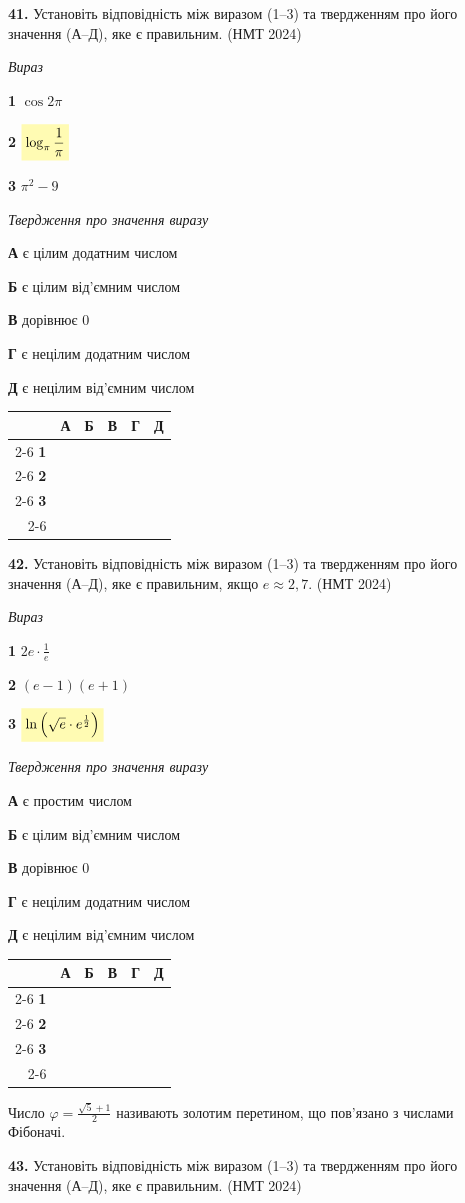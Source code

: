 \documentclass[14pt]{extarticle}
\newcommand{\answerGrid}{
    \begingroup
    \renewcommand{\arraystretch}{1.3} 
    \setlength{\tabcolsep}{7pt} 
    \begin{tabular}{r|c|c|c|c|c|}
         \multicolumn{1}{c}{} & \multicolumn{1}{c}{\textbf{А}} & \multicolumn{1}{c}{\textbf{Б}} & \multicolumn{1}{c}{\textbf{В}} & \multicolumn{1}{c}{\textbf{Г}} & \multicolumn{1}{c}{\textbf{Д}} \\ \cline{2-6}
         \textbf{1} & & & & & \\ \cline{2-6}
         \textbf{2} & & & & & \\ \cline{2-6}
         \textbf{3} & & & & & \\ \cline{2-6}
    \end{tabular}
    \endgroup
}
\newcommand{\matchingLayout}[3]{
    \noindent
    \begin{minipage}[t]{0.40\textwidth}
        #1
    \end{minipage}%
    \hfill
    \begin{minipage}[t]{0.28\textwidth}
        #2
    \end{minipage}%
    \hfill
    \begin{minipage}[t]{0.30\textwidth}
        \vspace{0pt}
        \begin{flushright}
        #3
        \end{flushright}
    \end{minipage}
}
\newcommand{\nmtyear}[1]{\hfill{\small\color{yearcolor}(НМТ #1)}}
\begin{document}
\noindent\textbf{41.} Установіть відповідність між виразом (1--3) та твердженням про його значення (А--Д), яке є правильним. \nmtyear{2024}
\vspace{0.3cm}

\matchingLayout{\textit{Вираз}

\textbf{1} \quad $\cos 2\pi$

\textbf{2} \quad $\colorbox{yellow!30}{$\log_\pi \dfrac{1}{\pi}$}$

\textbf{3} \quad $\pi^2 - 9$
}{
\textit{Твердження про значення виразу}

\textbf{А} \quad є цілим додатним числом

\textbf{Б} \quad є цілим від'ємним числом

\textbf{В} \quad дорівнює 0

\textbf{Г} \quad є нецілим додатним числом

\textbf{Д} \quad є нецілим від'ємним числом
}{
\answerGrid
}

\vspace{0.8cm}

\noindent\textbf{42.} Установіть відповідність між виразом (1--3) та твердженням про його значення (А--Д), яке є правильним, якщо $e \approx 2{,}7$. \nmtyear{2024}
\vspace{0.3cm}

\matchingLayout{\textit{Вираз}

\textbf{1} \quad $2e \cdot \displaystyle\frac{1}{e}$

\textbf{2} \quad $(e - 1)(e + 1)$

\textbf{3} \quad $\colorbox{yellow!30}{$\ln \left(\sqrt{e} \cdot e^{\frac{1}{2}}\right)$}$
}{
\textit{Твердження про значення виразу}

\textbf{А} \quad є простим числом

\textbf{Б} \quad є цілим від'ємним числом

\textbf{В} \quad дорівнює 0

\textbf{Г} \quad є нецілим додатним числом

\textbf{Д} \quad є нецілим від'ємним числом
}{
\answerGrid
}

\vspace{0.8cm}

\noindent Число $\varphi = \displaystyle\frac{\sqrt{5} + 1}{2}$ називають золотим перетином, що пов'язано з числами Фібоначі.

\noindent\textbf{43.} Установіть відповідність між виразом (1--3) та твердженням про його значення (А--Д), яке є правильним. \nmtyear{2024}
\vspace{0.3cm}
\end{document}

